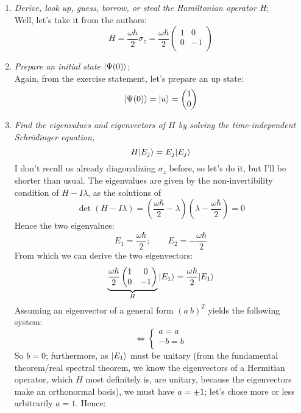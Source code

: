 \documentclass[solutions.tex]{subfiles}
\begin{document}
\begin{enumerate}
	\item \textit{Derive, look up, guess, borrow, or steal the Hamiltonian
	operator H}; \\
	Well, let's take it from the authors:
	\[
		H = \frac{\omega\hbar}2\sigma_z = \frac{\omega\hbar}2\begin{pmatrix}
			1 &  0 \\
			0 & -1 \\
		\end{pmatrix}
	\]
	\item \textit{Prepare an initial state $|\Psi(0)\rangle$}; \\
	Again, from the exercise statement, let's prepare an up state:
	\[
		|\Psi(0)\rangle = |u\rangle = \begin{pmatrix} 1 \\ 0 \\ \end{pmatrix}
	\]
	\item \textit{Find the eigenvalues and eigenvectors of $H$ by solving
	the time-independent Schr\"odinger equation,
	\[
		H|E_j\rangle = E_j|E_j\rangle
	\]}
	I don't recall us already diagonalizing $\sigma_z$ before, so
	let's do it, but I'll be shorter than usual. The eigenvalues
	are given by the non-invertibility condition of $H-I\lambda$,
	as the solutions of
	\[
		\det(H-I\lambda) =
			(\frac{\omega\hbar}2-\lambda)(\lambda-\frac{\omega\hbar}2) = 0
	\]
	Hence the two eigenvalues:
	\[
		E_1 = \frac{\omega\hbar}2;\qquad E_2 = -\frac{\omega\hbar}2
	\]
	From which we can derive the two eigenvectors:
	\[
		\underbrace{\frac{\omega\hbar}2\begin{pmatrix}
			1 & 0  \\
			0 & -1 \\
		\end{pmatrix}}_{H}|E_1\rangle = \frac{\omega\hbar}2|E_1\rangle
	\]
	Assuming an eigenvector of a general form $(a\ b)^T$ yields
	the following system:
	\[
		\Leftrightarrow \begin{cases}
			a = a \\
			-b = b \\
		\end{cases}
	\]
	So $b = 0$; furthermore, as $|E_1\rangle$ must be unitary
	(from the fundamental theorem/real spectral theorem, we know
	the eigenvectors of a Hermitian operator, which $H$ most definitely
	is, are unitary, because the eigenvectors make an orthonormal basis),
	we must have $a = \pm 1$; let's chose more or
	less arbitrarily $a = 1$. Hence:
	\[
\]
\end{enumerate}
\end{document}
